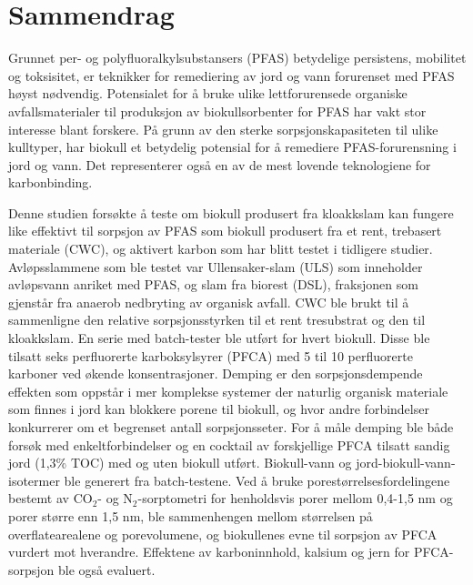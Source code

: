 \newpage
{}
\section*{Sammendrag}
Grunnet per- og polyfluoralkylsubstansers (PFAS) betydelige persistens, mobilitet og toksisitet, er teknikker for remediering av jord og vann forurenset med PFAS høyst nødvendig. Potensialet for å bruke ulike lettforurensede organiske avfallsmaterialer til produksjon av biokullsorbenter for PFAS har vakt stor interesse blant forskere. På grunn av den sterke sorpsjonskapasiteten til ulike kulltyper, har biokull et betydelig potensial for å remediere PFAS-forurensning i jord og vann. Det representerer også en av de mest lovende teknologiene for karbonbinding.

Denne studien forsøkte å teste om biokull produsert fra kloakkslam kan fungere like effektivt til sorpsjon av PFAS som biokull produsert fra et rent, trebasert materiale (CWC), og aktivert karbon som har blitt testet i tidligere studier. Avløpsslammene som ble testet var Ullensaker-slam (ULS) som inneholder avløpsvann anriket med PFAS, og slam fra biorest (DSL), fraksjonen som gjenstår fra anaerob nedbryting av organisk avfall. CWC ble brukt til å sammenligne den relative sorpsjonsstyrken til et rent tresubstrat og den til kloakkslam. En serie med batch-tester ble utført for hvert biokull. Disse ble tilsatt seks perfluorerte karboksylsyrer (PFCA) med 5 til 10 perfluorerte karboner ved økende konsentrasjoner. Demping er den sorpsjonsdempende effekten som oppstår i mer komplekse systemer der naturlig organisk materiale som finnes i jord kan blokkere porene til biokull, og hvor andre forbindelser konkurrerer om et begrenset antall sorpsjonsseter. For å måle demping ble både forsøk med enkeltforbindelser og en cocktail av forskjellige PFCA tilsatt sandig jord (1,3\% TOC) med og uten biokull utført. Biokull-vann og jord-biokull-vann-isotermer ble generert fra batch-testene. Ved å bruke porestørrelsesfordelingene bestemt av $\mathrm{CO_2}$- og $\mathrm{N_2}$-sorptometri for henholdsvis porer mellom 0,4-1,5 nm og porer større enn 1,5 nm, ble sammenhengen mellom størrelsen på overflatearealene og porevolumene, og biokullenes evne til sorpsjon av PFCA vurdert mot hverandre. Effektene av karboninnhold, kalsium og jern for PFCA-sorpsjon ble også evaluert.

